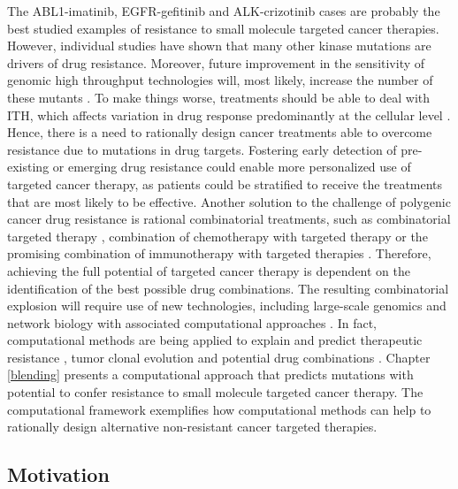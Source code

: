 \documentclass[11pt, b5paper,twoside]{tesi_upf}
\begin{document}
\par The ABL1-imatinib, EGFR-gefitinib and ALK-crizotinib cases are probably the best studied examples of resistance to small molecule targeted cancer therapies. However, individual studies have shown that many other kinase mutations are drivers of drug resistance. Moreover, future improvement in the sensitivity of genomic high throughput technologies will, most likely, increase the number of these mutants \cite{Schmitt2015}. To make things worse, treatments should be able to deal with ITH, which affects variation in drug response predominantly at the cellular level \cite{Burrell2014}. Hence, there is a need to rationally design cancer treatments able to overcome resistance due to mutations in drug targets. Fostering early detection of pre-existing or emerging drug resistance could enable more personalized use of targeted cancer therapy, as patients could be stratified to receive the treatments that are most likely to be effective. Another solution to the challenge of polygenic cancer drug resistance is rational combinatorial treatments, such as combinatorial targeted therapy \cite{Flaherty2012}, combination of chemotherapy with targeted therapy \cite{Cortes2016} or the promising combination of immunotherapy with targeted therapies \cite{Vanneman2012, Ribas2013}. Therefore, achieving the full potential of targeted cancer therapy is dependent on the identification of the best possible drug combinations. The resulting combinatorial explosion will require use of new technologies, including large-scale genomics and network biology with associated computational approaches \cite{Al-Lazikani2012}. In fact, computational methods are being applied to explain and predict therapeutic resistance \cite{Bozic2013, Komarova2014}, tumor clonal evolution \cite{Williams2016, Attolini2010} and potential drug combinations \cite{Chmielecki2011, Huang2007}. Chapter \ref{blending} presents a computational approach that predicts mutations with potential to confer resistance to small molecule targeted cancer therapy. The computational framework exemplifies how computational methods can help to rationally design alternative non-resistant cancer targeted therapies. 

 
\subsection{Motivation}
\end{document}
